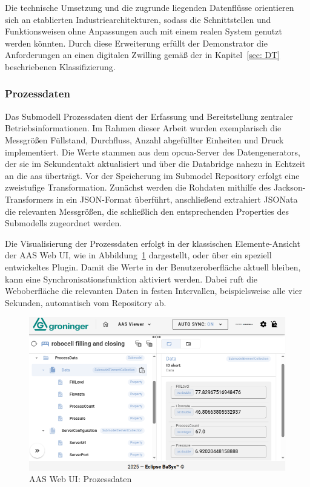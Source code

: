 Die technische Umsetzung und die zugrunde liegenden Datenflüsse orientieren sich an etablierten Industriearchitekturen, sodass die Schnittstellen und Funktionsweisen ohne Anpassungen auch mit einem realen System genutzt werden könnten.
Durch diese Erweiterung erfüllt der Demonstrator die Anforderungen an einen digitalen Zwilling gemäß der in Kapitel~\ref{sec: DT} beschriebenen Klassifizierung.

\subsubsection*{Prozessdaten}

Das Submodell Prozessdaten dient der Erfassung und Bereitstellung zentraler Betriebsinformationen.
Im Rahmen dieser Arbeit wurden exemplarisch die Messgrößen Füllstand, Durchfluss, Anzahl abgefüllter Einheiten und Druck implementiert.
Die Werte stammen aus dem \acs{opcua}-Server des Datengenerators, der sie im Sekundentakt aktualisiert und über die Databridge nahezu in Echtzeit an die \acs{aas} überträgt.
Vor der Speicherung im Submodel Repository erfolgt eine zweistufige Transformation.
Zunächst werden die Rohdaten mithilfe des Jackson-Transformers in ein JSON-Format überführt, anschließend extrahiert JSONata die relevanten Messgrößen, die schließlich den entsprechenden Properties des Submodells zugeordnet werden.

Die Visualisierung der Prozessdaten erfolgt in der klassischen Elemente-Ansicht der AAS Web UI, wie in Abbildung~\ref{fig:Processdata} dargestellt, oder über ein speziell entwickeltes Plugin.
Damit die Werte in der Benutzeroberfläche aktuell bleiben, kann eine Synchronisationsfunktion aktiviert werden.
Dabei ruft die Weboberfläche die relevanten Daten in festen Intervallen, beispielsweise alle vier Sekunden, automatisch vom Repository ab.

\newpage
\begin{figure}[htbp]
    \centering
    \includegraphics[width=1\textwidth]{Bilder/Ergebnisse/DynamischeDaten/ProcessData/VisualisierungNeu.png}
    \caption{AAS Web UI: Prozessdaten}
    \label{fig:Processdata}
\end{figure}

